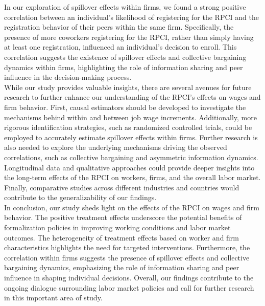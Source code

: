 \documentclass[10pt, oneside]{book}
\begin{document}
In our exploration of spillover effects within firms, we found a strong positive correlation between an individual's likelihood of registering for the RPCI and the registration behavior of their peers within the same firm. Specifically, the presence of more coworkers registering for the RPCI, rather than simply having at least one registration, influenced an individual's decision to enroll. This correlation suggests the existence of spillover effects and collective bargaining dynamics within firms, highlighting the role of information sharing and peer influence in the decision-making process. \\

While our study provides valuable insights, there are several avenues for future research to further enhance our understanding of the RPCI's effects on wages and firm behavior. First, causal estimators should be developed to investigate the mechanisms behind within and between job wage increments. Additionally, more rigorous identification strategies, such as randomized controlled trials, could be employed to accurately estimate spillover effects within firms. Further research is also needed to explore the underlying mechanisms driving the observed correlations, such as collective bargaining and asymmetric information dynamics. Longitudinal data and qualitative approaches could provide deeper insights into the long-term effects of the RPCI on workers, firms, and the overall labor market. Finally, comparative studies across different industries and countries would contribute to the generalizability of our findings. \\

In conclusion, our study sheds light on the effects of the RPCI on wages and firm behavior. The positive treatment effects underscore the potential benefits of formalization policies in improving working conditions and labor market outcomes. The heterogeneity of treatment effects based on worker and firm characteristics highlights the need for targeted interventions. Furthermore, the correlation within firms suggests the presence of spillover effects and collective bargaining dynamics, emphasizing the role of information sharing and peer influence in shaping individual decisions. Overall, our findings contribute to the ongoing dialogue surrounding labor market policies and call for further research in this important area of study. \\

\end{document}
